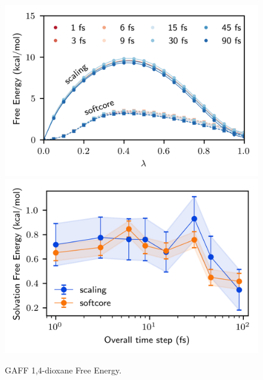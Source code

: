 \documentclass[
aip,
jcp,
reprint,
]{revtex4-1}
\begin{document}
\appendix

\begin{figure}
	\centering
	\includegraphics{gaff_dioxane_vdw_free_energy_profiles}
	\includegraphics{gaff_dioxane_vdw_free_energies}
	\caption{GAFF 1,4-dioxane Free Energy.}
	\label{fig:dioxane vdw free energy}
\end{figure}
\end{document}
